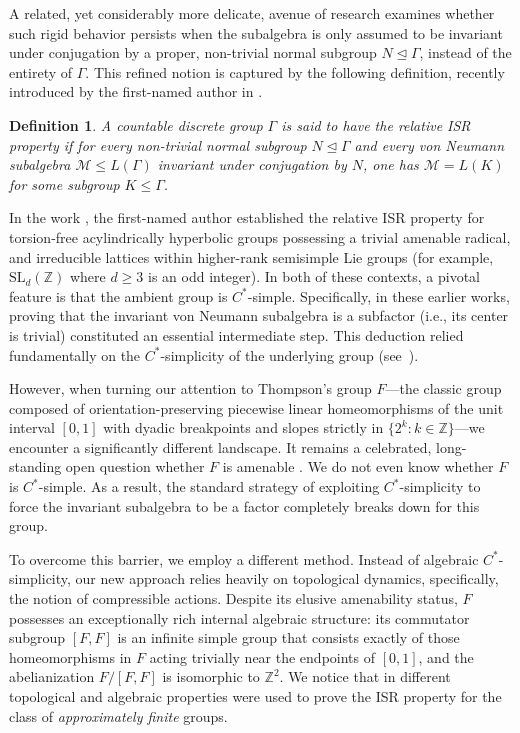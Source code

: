 \documentclass[11pt]{amsart}
\newtheorem{definition}[theorem]{Definition}
\theoremstyle{definition}
\newcommand{\Z}{\mathbb{Z}}
\newcommand{\cM}{\mathcal{M}}
\begin{document}
A related, yet considerably more delicate, avenue of research examines whether such rigid behavior persists when the subalgebra is only assumed to be invariant under conjugation by a proper, non-trivial normal subgroup $N \trianglelefteq \Gamma$, instead of the entirety of $\Gamma$. This refined notion is captured by the following definition, recently introduced by the first-named author in \cite{Amr26}.
\begin{definition}
A countable discrete group $\Gamma$ is said to have the \emph{relative ISR property} if for every non-trivial normal subgroup $N \trianglelefteq \Gamma$ and every von Neumann subalgebra $\cM \le L(\Gamma)$ invariant under conjugation by $N$, one has $\cM = L(K)$ for some subgroup $K \le \Gamma$.
\end{definition}
In the work \cite{Amr26}, the first-named author established the relative ISR property for torsion-free acylindrically hyperbolic groups possessing a trivial amenable radical, and irreducible lattices within higher-rank semisimple Lie groups (for example, $\mathrm{SL}_d(\Z)$ where $d \ge 3$ is an odd integer). In both of these contexts, a pivotal feature is that the ambient group is $C^*$-simple. Specifically, in these earlier works, proving that the invariant von Neumann subalgebra is a subfactor (i.e., its center is trivial) constituted an essential intermediate step. This deduction relied fundamentally on the $C^*$-simplicity of the underlying group (see~\cite{AHO24}).

However, when turning our attention to Thompson's group $F$---the classic group composed of orientation-preserving piecewise linear homeomorphisms of the unit interval $[0,1]$ with dyadic breakpoints and slopes strictly in $\{2^k : k \in \Z\}$---we encounter a significantly different landscape. It remains a celebrated, long-standing open question whether $F$ is amenable \cite{CFP96}. We do not even know whether $F$ is $C^*$-simple. As a result, the standard strategy of exploiting $C^*$-simplicity to force the invariant subalgebra to be a factor completely breaks down for this group. 

To overcome this barrier, we employ a different method. Instead of algebraic $C^*$-simplicity, our new approach relies heavily on topological dynamics, specifically, the notion of compressible actions. Despite its elusive amenability status, $F$ possesses an exceptionally rich internal algebraic structure: its commutator subgroup $[F,F]$ is an infinite simple group \cite{Brown87} that consists exactly of those homeomorphisms in $F$ acting trivially near the endpoints of $[0,1]$, and the abelianization $F/[F,F]$ is  isomorphic to $\Z^2$. We notice that in \cite{DJ24} different topological and algebraic properties were used to prove the ISR property for the class of \emph{approximately finite} groups.
\end{document}
